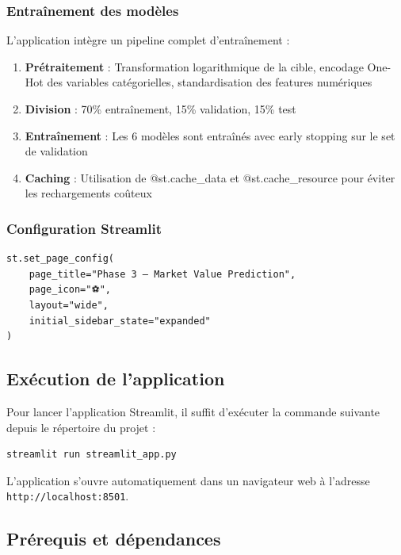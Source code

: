 \documentclass[12pt,a4paper]{article}
\begin{document}
\subsubsection{Entraînement des modèles}

L'application intègre un pipeline complet d'entraînement :

\begin{enumerate}
    \item \textbf{Prétraitement} : Transformation logarithmique de la cible, encodage One-Hot des variables catégorielles, standardisation des features numériques
    \item \textbf{Division} : 70\% entraînement, 15\% validation, 15\% test
    \item \textbf{Entraînement} : Les 6 modèles sont entraînés avec early stopping sur le set de validation
    \item \textbf{Caching} : Utilisation de @st.cache\_data et @st.cache\_resource pour éviter les rechargements coûteux
\end{enumerate}

\subsubsection{Configuration Streamlit}

\begin{verbatim}
st.set_page_config(
    page_title="Phase 3 — Market Value Prediction",
    page_icon="⚽",
    layout="wide",
    initial_sidebar_state="expanded"
)
\end{verbatim}

\subsection{Exécution de l'application}

Pour lancer l'application Streamlit, il suffit d'exécuter la commande suivante depuis le répertoire du projet :

\begin{tcolorbox}[colback=lightgray,colframe=maincolor,width=\textwidth,arc=2mm,boxrule=0.8pt]
\begin{verbatim}
streamlit run streamlit_app.py
\end{verbatim}
\end{tcolorbox}

L'application s'ouvre automatiquement dans un navigateur web à l'adresse \texttt{http://localhost:8501}.

\subsection{Prérequis et dépendances}
\end{document}
